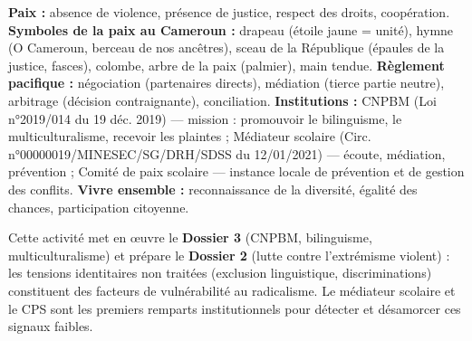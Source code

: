 \documentclass[11pt]{article}
\newcounter{popsec}
\newcounter{popsub}
\newcommand{\courssub}[1]{%
  \stepcounter{popsub}%
  \par\vspace{9pt}\noindent{\popxbold\fontsize{11.5}{13}\selectfont\color{popink}{\color{poporange}\thepopsec.\thepopsub}\hspace{6pt}#1}\par\nopagebreak\vspace{4pt}
}
\begin{document}
\courssub{Ressources à mobiliser}
\begin{aretenir}
\textbf{Paix :} absence de violence, présence de justice, respect des droits, coopération. \textbf{Symboles de la paix au Cameroun :} drapeau (étoile jaune = unité), hymne (O Cameroun, berceau de nos ancêtres), sceau de la République (épaules de la justice, fasces), colombe, arbre de la paix (palmier), main tendue. \textbf{Règlement pacifique :} négociation (partenaires directs), médiation (tierce partie neutre), arbitrage (décision contraignante), conciliation. \textbf{Institutions :} CNPBM (Loi n°2019/014 du 19 déc. 2019) — mission : promouvoir le bilinguisme, le multiculturalisme, recevoir les plaintes ; Médiateur scolaire (Circ. n°00000019/MINESEC/SG/DRH/SDSS du 12/01/2021) — écoute, médiation, prévention ; Comité de paix scolaire — instance locale de prévention et de gestion des conflits. \textbf{Vivre ensemble :} reconnaissance de la diversité, égalité des chances, participation citoyenne.
\end{aretenir}

\begin{attention}
Cette activité met en œuvre le \textbf{Dossier 3} (CNPBM, bilinguisme, multiculturalisme) et prépare le \textbf{Dossier 2} (lutte contre l'extrémisme violent) : les tensions identitaires non traitées (exclusion linguistique, discriminations) constituent des facteurs de vulnérabilité au radicalisme. Le médiateur scolaire et le CPS sont les premiers remparts institutionnels pour détecter et désamorcer ces signaux faibles.
\end{attention}
\end{document}
